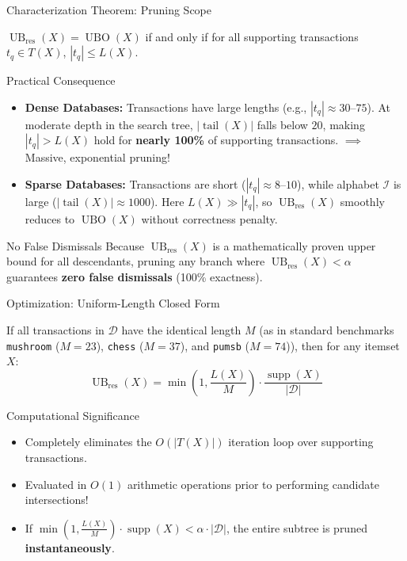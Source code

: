 \documentclass[aspectratio=169,10pt]{beamer}
\newcommand{\supp}{\operatorname{supp}}
\newcommand{\UBO}{\operatorname{UBO}}
\newcommand{\UBres}{\operatorname{UB}_{\text{res}}}
\newcommand{\tail}{\operatorname{tail}}
\begin{document}
\begin{frame}{Characterization Theorem: Pruning Scope}
  \begin{theorem}
    $\UBres(X) = \UBO(X)$ if and only if for all supporting transactions $t_q \in T(X)$, $|t_q| \le L(X)$.
  \end{theorem}

  \begin{block}{Practical Consequence}
    \begin{itemize}
      \item \textbf{Dense Databases:} Transactions have large lengths (e.g., $|t_q| \approx 30$--$75$). At moderate depth in the search tree, $|\tail(X)|$ falls below $20$, making $|t_q| > L(X)$ hold for \textbf{nearly 100\%} of supporting transactions. $\implies$ Massive, exponential pruning!
      \item \textbf{Sparse Databases:} Transactions are short ($|t_q| \approx 8$--$10$), while alphabet $\mathcal{I}$ is large ($|\tail(X)| \approx 1000$). Here $L(X) \gg |t_q|$, so $\UBres(X)$ smoothly reduces to $\UBO(X)$ without correctness penalty.
    \end{itemize}
  \end{block}

  \begin{alertblock}{No False Dismissals}
    Because $\UBres(X)$ is a mathematically proven upper bound for all descendants, pruning any branch where $\UBres(X) < \alpha$ guarantees \textbf{zero false dismissals} (100\% exactness).
  \end{alertblock}
\end{frame}

\begin{frame}{Optimization: Uniform-Length Closed Form}
  \begin{proposition}
    If all transactions in $\mathcal{D}$ have the identical length $M$ (as in standard benchmarks \texttt{mushroom} ($M=23$), \texttt{chess} ($M=37$), and \texttt{pumsb} ($M=74$)), then for any itemset $X$:
    $$\UBres(X) = \min\left(1, \frac{L(X)}{M}\right) \cdot \frac{\supp(X)}{|\mathcal{D}|}$$
  \end{proposition}

  \begin{block}{Computational Significance}
    \begin{itemize}
      \item Completely eliminates the $O(|T(X)|)$ iteration loop over supporting transactions.
      \item Evaluated in $O(1)$ arithmetic operations prior to performing candidate intersections!
      \item If $\min\left(1, \frac{L(X)}{M}\right) \cdot \supp(X) < \alpha \cdot |\mathcal{D}|$, the entire subtree is pruned \textbf{instantaneously}.
    \end{itemize}
  \end{block}
\end{frame}
\end{document}
